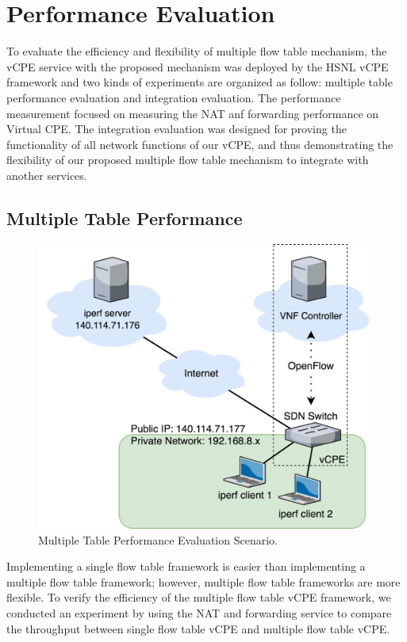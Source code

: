 \chapter{Performance Evaluation} \label{ch:evaluation}

To evaluate the efficiency and flexibility of multiple flow table mechanism, the vCPE service with the proposed mechanism was deployed by the HSNL vCPE framework and two kinds of experiments are organized as follow: multiple table performance evaluation and integration evaluation. The performance measurement focused on measuring the NAT anf forwarding performance on Virtual CPE. The integration evaluation was designed for proving the functionality of all network functions of our vCPE, and thus demonstrating the flexibility of our proposed multiple flow table mechanism to integrate with another services.
\section{Multiple Table Performance}

\begin{figure}[!t]
\centering
\includegraphics[width=\textwidth]{./fig/throughput_measurement_scenario.png}
\caption{Multiple Table Performance Evaluation Scenario.}
\label{fig:throughput_measurement_scenario}
\end{figure}

Implementing a single flow table framework is easier than implementing a multiple flow table framework; however, multiple flow table frameworks are more flexible. To verify the efficiency of the multiple flow table vCPE framework, we conducted an experiment by using the NAT and forwarding service to compare the throughput between single flow table vCPE and multiple flow table vCPE.

